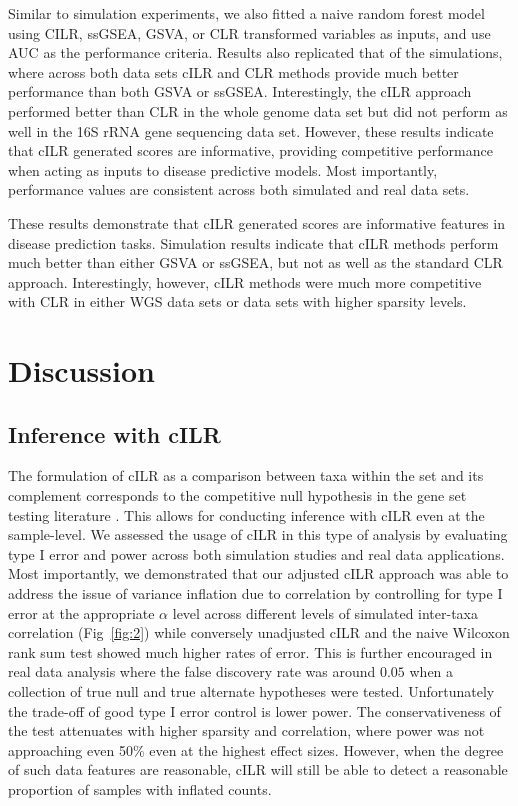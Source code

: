\documentclass[10pt,letterpaper]{article}
\begin{document}
Similar to simulation experiments, we also fitted a naive random forest model using CILR, ssGSEA, GSVA, or CLR transformed variables as inputs, and use AUC as the performance criteria. Results also replicated that of the simulations, where across both data sets cILR and CLR methods provide much better performance than both GSVA or ssGSEA. Interestingly, the cILR approach performed better than CLR in the whole genome data set but did not perform as well in the 16S rRNA gene sequencing data set. However, these results indicate that cILR generated scores are informative, providing competitive performance when acting as inputs to disease predictive models. Most importantly, performance values are consistent across both simulated and real data sets. 

These results demonstrate that cILR generated scores are informative features in disease prediction tasks. Simulation results indicate that cILR methods perform much better than either GSVA or ssGSEA, but not as well as the standard CLR approach. Interestingly, however, cILR methods were much more competitive with CLR in either WGS data sets or data sets with higher sparsity levels. 


\section*{Discussion}

\subsection*{Inference with cILR}
The formulation of cILR as a comparison between taxa within the set and its complement corresponds to the competitive null hypothesis in the gene set testing literature \cite{tian2005}. This allows for conducting inference with cILR even at the sample-level. We assessed the usage of cILR in this type of analysis by evaluating type I error and power across both simulation studies and real data applications. Most importantly, we demonstrated that our adjusted cILR approach was able to address the issue of variance inflation due to correlation \cite{wu2012} by controlling for type I error at the appropriate $\alpha$ level across different levels of simulated inter-taxa correlation (Fig~\ref{fig:2}) while conversely unadjusted cILR and the naive Wilcoxon rank sum test showed much higher rates of error. This is further encouraged in real data analysis where the false discovery rate was around $0.05$ when a collection of true null and true alternate hypotheses were tested. Unfortunately the trade-off of good type I error control is lower power. The conservativeness of the test attenuates with higher sparsity and correlation, where power was not approaching even 50\% even at the highest effect sizes. However, when the degree of such data features are reasonable, cILR will still be able to detect a reasonable proportion of samples with inflated counts.  
\end{document}
